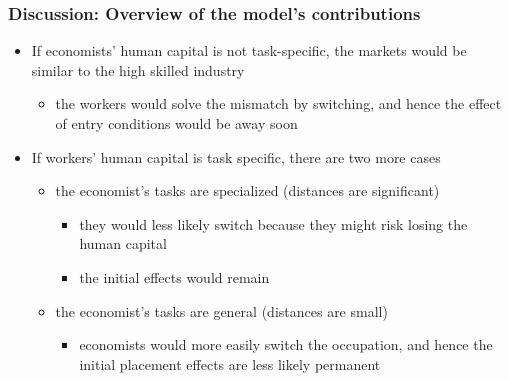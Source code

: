 \documentclass[11pt]{beamer}
\begin{document}
\begin{frame}
	\frametitle{Discussion: Overview of the model's contributions}
	\begin{itemize}
		
		\item  If economists’ human capital is not task-specific, the markets would be similar to the high skilled industry
		\begin{itemize}
			\vspace{0.6 mm}
			\item  the workers would solve the mismatch by switching, and hence the effect of entry conditions would be away soon
		\end{itemize}
		\vspace{1 mm}
		
			\item If workers' human capital is task specific, there are two more cases
		\begin{itemize}
			\item the economist’s tasks are specialized (distances  are significant)
			\begin{itemize}
				\item they would less likely switch because they might risk losing the human capital 
				\item the initial effects would remain 
			\end{itemize}
		\vspace{1 mm}
			\item the economist’s tasks are general (distances are small)
			\begin{itemize}
				\item  economists would more easily switch the occupation, and hence the initial placement effects are less likely permanent
			\end{itemize}
		\end{itemize}

	\end{itemize}
\end{frame}
\end{document}
